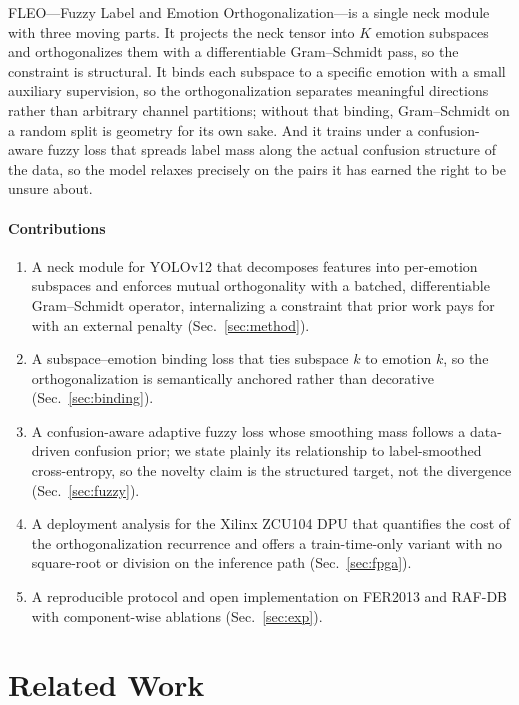 \documentclass[journal]{IEEEtran}
\begin{document}
FLEO---Fuzzy Label and Emotion Orthogonalization---is a single neck module
with three moving parts. It projects the neck tensor into $K$ emotion
subspaces and orthogonalizes them with a differentiable Gram--Schmidt pass, so
the constraint is structural. It binds each subspace to a specific emotion
with a small auxiliary supervision, so the orthogonalization separates
meaningful directions rather than arbitrary channel partitions; without that
binding, Gram--Schmidt on a random split is geometry for its own sake. And it
trains under a confusion-aware fuzzy loss that spreads label mass along the
actual confusion structure of the data, so the model relaxes precisely on the
pairs it has earned the right to be unsure about.

\paragraph*{Contributions}
\begin{enumerate}
\item A neck module for YOLOv12 that decomposes features into per-emotion
subspaces and enforces mutual orthogonality with a batched, differentiable
Gram--Schmidt operator, internalizing a constraint that prior work pays for
with an external penalty (Sec.~\ref{sec:method}).
\item A subspace--emotion binding loss that ties subspace $k$ to emotion $k$,
so the orthogonalization is semantically anchored rather than decorative
(Sec.~\ref{sec:binding}).
\item A confusion-aware adaptive fuzzy loss whose smoothing mass follows a
data-driven confusion prior; we state plainly its relationship to
label-smoothed cross-entropy, so the novelty claim is the structured target,
not the divergence (Sec.~\ref{sec:fuzzy}).
\item A deployment analysis for the Xilinx ZCU104 DPU that quantifies the cost
of the orthogonalization recurrence and offers a train-time-only variant with
no square-root or division on the inference path (Sec.~\ref{sec:fpga}).
\item A reproducible protocol and open implementation on FER2013 and RAF-DB
with component-wise ablations (Sec.~\ref{sec:exp}).
\end{enumerate}

\section{Related Work}
\end{document}
